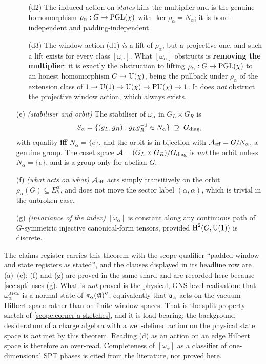 \begin{theorem}
\begin{enumerate}
\begin{enumerate}
  \item[(d2)] The induced action on \emph{states} kills the multiplier and is the
    genuine homomorphism $\rho_\alpha:G\to\PGL(\chi)$ with
    $\ker\rho_\alpha=N_\alpha$; it is bond-independent and padding-independent.
  \item[(d3)] The window action (d1) \emph{is} a lift of $\rho_\alpha$, but a
    projective one, and such a lift exists for every class $[\omega_\alpha]$.
    What $[\omega_\alpha]$ obstructs is \textbf{removing the multiplier}: it is
    exactly the obstruction to lifting $\rho_\alpha:G\to\PGL(\chi)$ to an honest
    homomorphism $G\to\Ug(\chi)$, being the pullback under $\rho_\alpha$ of the
    extension class of $1\to\Ug(1)\to\Ug(\chi)\to\PU(\chi)\to1$.  It does
    \emph{not} obstruct the projective window action, which always exists.
  \end{enumerate}
\item[(e)] \emph{(stabiliser and orbit)} The stabiliser of $\omega_\alpha$ in
  $G_L\times G_R$ is
  \[
    S_\alpha=\{(g_L,g_R): g_Lg_R^{-1}\in N_\alpha\}\;\supseteq\;G_{\mathrm{diag}},
  \]
  with equality \textbf{iff} $N_\alpha=\{e\}$, and the orbit is in bijection with
  $\mathcal{A}_{\mathrm{eff}}=G/N_\alpha$, a genuine group.  The coset space
  $\mathcal{A}=(G_L\times G_R)/G_{\mathrm{diag}}$ is \emph{not} the orbit unless $N_\alpha=\{e\}$,
  and is a group only for abelian $G$.
\item[(f)] \emph{(what acts on what)} $\mathcal{A}_{\mathrm{eff}}$ acts simply transitively on the
  orbit $\rho_\alpha(G)\subseteq E^\alpha_b$, and does not move the sector label
  $(\alpha,\alpha)$, which is trivial in the unbroken case.
\item[(g)] \emph{(invariance of the index)} $[\omega_\alpha]$ is constant along
  any continuous path of $G$-symmetric injective canonical-form tensors, provided
  $\operatorname{H}^2(G,\operatorname{U}(1))$ is discrete.
\end{enumerate}
\end{theorem}

\begin{scope}
The claims register carries this theorem with the scope qualifier ``padded-window
and state registers as stated'', and the clauses displayed in its headline row
are (a)--(e); (f) and (g) are proved in the same shard and are recorded here
because \cref{sec:spt} uses (g).  What is \emph{not} proved is the physical,
GNS-level realisation: that $\omega_\alpha^{M@b}$ is a normal state of
$\pi_\alpha(\mathfrak{A})''$, equivalently that $\mathfrak{a}_\alpha$ acts on the vacuum Hilbert
space rather than on finite-window spaces.  That is the split-property sketch of
\cref{scope:corner-a-sketches}, and it is load-bearing: the background
desideratum of a charge algebra with a well-defined action on the physical state
space is \emph{not} met by this theorem.  Reading (d) as an action on an edge
Hilbert space is therefore an over-read.  Completeness of $[\omega_\alpha]$ as a
classifier of one-dimensional SPT phases is cited from the literature, not proved
here.
\end{scope}

